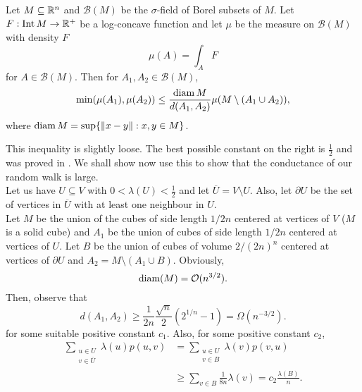 \begin{ftheo}
\label{conductance isoperimetric inequality}
Let $M\subseteq\mathbb{R}^n$ and $\mathcal{B}(M)$ be the $\sigma$-field of Borel subsets of $M$. Let $F:\operatorname{Int} M\to\mathbb{R}^+$ be a log-concave function and let $\mu$ be the measure on $\mathcal{B}(M)$ with density $F$
\[ \mu(A) = \int_A F \]
for $A\in\mathcal{B}(M)$. Then for $A_1,A_2\in\mathcal{B}(M)$,
\[ \min(\mu(A_1),\mu(A_2)) \leq \frac{\operatorname{diam} M}{d(A_1,A_2)}\mu(M \setminus (A_1\cup A_2)), \]
where $\operatorname{diam} M = \sup\{\left\lVert x-y\right\rVert:x,y\in M\}$.
\end{ftheo}

This inequality is slightly loose. The best possible constant on the right is $\frac{1}{2}$ and was proved in \cite{dyer-frieze-sample-outside}. We shall show now use this to show that the conductance of our random walk is large.\\
Let us have $U\subseteq V$ with $0<\lambda(U)<\frac{1}{2}$ and let $\overline{U}=V\setminus U$. Also, let $\partial{U}$ be the set of vertices in $\overline{U}$ with at least one neighbour in $U$.\\
Let $M$ be the union of the cubes of side length $1/2n$ centered at vertices of $V$ ($M$ is a solid cube) and $A_1$ be the union of cubes of side length $1/2n$ centered at vertices of $U$. Let $B$ be the union of cubes of volume $2/(2n)^n$ centered at vertices of $\partial U$ and $A_2 = M \setminus (A_1 \cup B)$. Obviously,
\begin{equation}
    \operatorname{diam}(M) = \mathcal{O}(n^{3/2}).
\end{equation}
Then, observe that
\begin{equation}
    d(A_1,A_2) \geq \frac{1}{2n}\frac{\sqrt{n}}{2} (2^{1/n} - 1) = \Omega(n^{-3/2}).
\end{equation}
for some suitable positive constant $c_1$. Also, for some positive constant $c_2$,
\begin{align*}
    \sum_{\substack{u\in U \\ v \in \overline{U}}}\lambda(u)p(u,v) &= \sum_{\substack{u\in U \\ v \in B}}\lambda(v)p(v,u)\\
    &\geq \sum_{v\in B} \frac{1}{8n} \lambda(v) = c_2\frac{\lambda(B)}{n}.
\end{align*}


